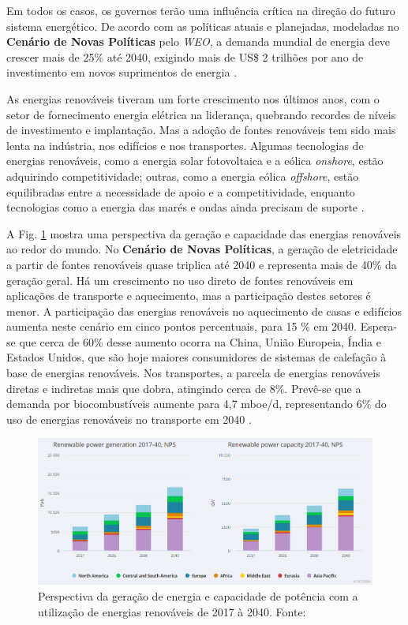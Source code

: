 Em todos os casos, os governos terão uma influência crítica na direção do futuro sistema energético. 
De acordo com as políticas atuais e planejadas, modeladas no \textbf{Cenário de Novas Políticas} pelo \textit{WEO}, a demanda mundial de energia deve crescer mais de 25\% até 2040, exigindo mais de US\$ 2 trilhões por ano de investimento em novos suprimentos de energia \cite{WEO2018}.

As energias renováveis tiveram um forte crescimento nos últimos anos, com o setor de fornecimento energia elétrica na liderança, quebrando recordes de níveis de investimento e implantação.
Mas a adoção de fontes renováveis tem sido mais lenta na indústria, nos edifícios e nos transportes.
Algumas tecnologias de energias renováveis, como a energia solar fotovoltaica e a eólica \textit{onshore}, estão adquirindo competitividade; outras, como a energia eólica \textit{offshore}, estão equilibradas entre a necessidade de apoio e a competitividade, enquanto tecnologias como a energia das marés e ondas ainda precisam de suporte \cite{WEO2018}.

A Fig. \ref{fig:geracao-capacidade-energias-renovaveis} mostra uma perspectiva da geração e capacidade das energias renováveis ao redor do mundo. 
No \textbf{Cenário de Novas Políticas}, a geração de eletricidade a partir de fontes renováveis quase triplica até 2040 e representa mais de 40\% da geração geral.
Há um crescimento no uso direto de fontes renováveis em aplicações de transporte e aquecimento, mas a participação destes setores é menor.
A participação das energias renováveis no aquecimento de casas e edifícios aumenta neste cenário em cinco pontos percentuais, para 15 \% em 2040.
Espera-se que cerca de 60\% desse aumento ocorra na China, União Europeia, Índia e Estados Unidos, que são hoje maiores consumidores de sistemas de calefação à base de energias renováveis.
Nos transportes, a parcela de energias renováveis diretas e indiretas mais que dobra, atingindo cerca de 8\%. 
Prevê-se que a demanda por biocombustíveis aumente para 4,7 mboe/d, representando 6\% do uso de energias renováveis no transporte em 2040 \cite{WEO2018}.

\begin{figure}[!hbt]
	\begin{center}
    \includegraphics[width=\textwidth]{figuras/geracao_capacidade_potencia_energias_renovaveis.png}
    \caption{Perspectiva da geração de energia e capacidade de potência com a utilização de energias renováveis de 2017 à 2040. Fonte: \cite{WEO2018}}
    \label{fig:geracao-capacidade-energias-renovaveis}
    \end{center}
\end{figure}

